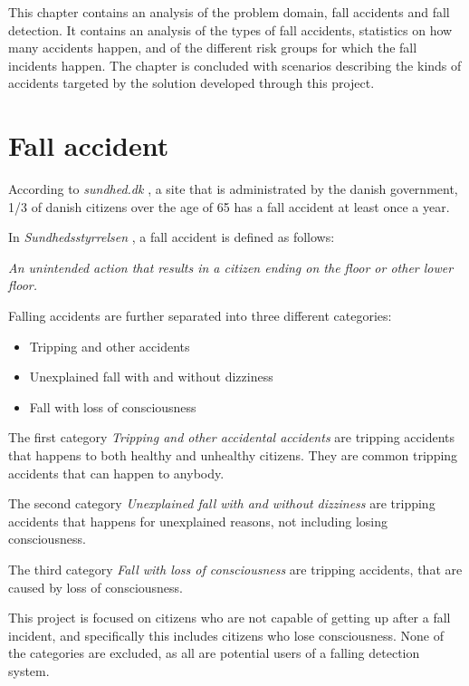 \label{preliminaries:problemanalysis}
This chapter contains an analysis of the problem domain, fall accidents and fall detection. It contains an analysis of the types of fall accidents, statistics on how many accidents happen, and of the different risk groups for which the fall incidents happen. The chapter is concluded with scenarios describing the kinds of accidents targeted by the solution developed through this project.

\section{Fall accident}
According to \textit{sundhed.dk} \cite{SundhedFald}, a site that is administrated by the danish government, 1/3 of danish citizens over the age of 65 has a fall accident at least once a year.

In \textit{Sundhedsstyrrelsen} \cite{Sundhedsstyrrelsen:Faldpatienter}, a fall accident is defined as follows:

\begin{center}
    \textit{An unintended action that results in a citizen ending on the floor or other lower floor.}
\end{center}

Falling accidents are further separated into three different categories:
\begin{itemize}
    \item Tripping and other accidents
    \item Unexplained fall with and without dizziness
    \item Fall with loss of consciousness
\end{itemize}

The first category \textit{Tripping and other accidental accidents} are tripping accidents that happens to both healthy and unhealthy citizens. They are common tripping accidents that can happen to anybody.

The second category \textit{Unexplained fall with and without dizziness} are tripping accidents that happens for unexplained reasons, not including losing consciousness.

The third category \textit{Fall with loss of consciousness} are tripping accidents, that are caused by loss of consciousness.

This project is focused on citizens who are not capable of getting up after a fall incident, and specifically this includes citizens who lose consciousness. None of the categories are excluded, as all are potential users of a falling detection system.

